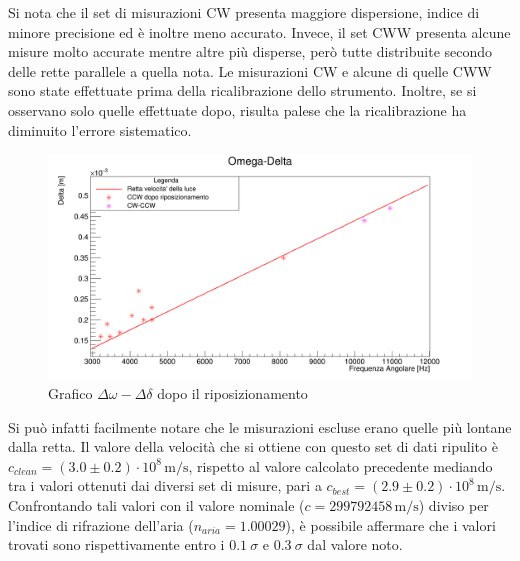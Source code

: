 \documentclass{article}
\begin{document}
        Si nota che il set di misurazioni CW presenta maggiore dispersione, indice di minore precisione ed è inoltre meno accurato. 
        Invece, il set CWW presenta alcune misure molto accurate mentre altre più disperse, però tutte distribuite secondo delle rette parallele a quella nota. 
        Le misurazioni CW e alcune di quelle CWW sono state effettuate prima della ricalibrazione dello strumento. 
        Inoltre, se si osservano solo quelle effettuate dopo, risulta palese che la ricalibrazione ha diminuito l'errore sistematico.

        \begin{figure}[H]

            \centering
            \includegraphics[scale=0.32]{../images/omega_delta2.png}
            \caption{Grafico $\Delta\omega-\Delta\delta$ dopo il riposizionamento}
            \label{fig:Omega-Delta2}

        \end{figure}

        Si può infatti facilmente notare che le misurazioni escluse erano quelle più lontane dalla retta. 
        Il valore della velocità che si ottiene con questo set di dati ripulito è 
        $c_{clean} = (3.0 \pm 0.2) \cdot 10^8\, \mathrm{m/s}$, rispetto al valore calcolato precedente mediando tra i valori ottenuti dai diversi set di misure, 
        pari a $c_{best} = (2.9 \pm 0.2)\cdot10^8\, \mathrm{m/s.}$
        Confrontando tali valori con il valore nominale ($ c = 299 792 458\, \mathrm{m/s}$) diviso per l'indice di rifrazione dell'aria ($n_{aria} = 1.00029$), 
        è possibile affermare che i valori trovati sono rispettivamente entro i $0.1~\sigma$ e  $0.3~\sigma$ dal valore noto.
\end{document}
